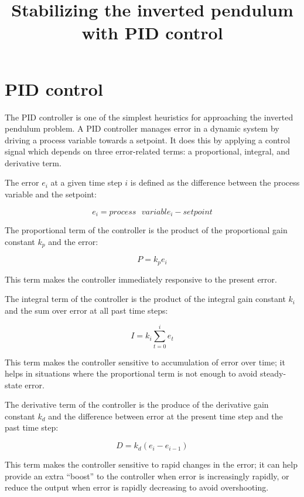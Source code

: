 \documentclass[12pt]{article}
\title{Stabilizing the inverted pendulum with PID control}
\date{}
\begin{document}
\maketitle

\section{PID control}

The PID controller is one of the simplest heuristics for approaching the inverted pendulum problem. A PID controller manages error in a dynamic system by driving a process variable towards a setpoint. It does this by applying a control signal which depends on three error-related terms: a proportional, integral, and derivative term.

The error $e_i$ at a given time step $i$ is defined as the difference between the process variable and the setpoint:

\begin{equation}
e_i = process\mbox{ }variable_i - setpoint
\end{equation}

The proportional term of the controller is the product of the proportional gain constant $k_p$ and the error:

\begin{equation}
P = k_p e_i
\end{equation}

This term makes the controller immediately responsive to the present error.

The integral term of the controller is the product of the integral gain constant $k_i$ and the sum over error at all past time steps:

\begin{equation}
I = k_i \sum_{t = 0}^{i} e_t
\end{equation}

This term makes the controller sensitive to accumulation of error over time; it helps in situations where the proportional term is not enough to avoid steady-state error.

The derivative term of the controller is the produce of the derivative gain constant $k_d$ and the difference between error at the present time step and the past time step:

\begin{equation}
D = k_d (e_i - e_{i-1})
\end{equation}

This term makes the controller sensitive to rapid changes in the error; it can help provide an extra ``boost'' to the controller when error is increasingly rapidly, or reduce the output when error is rapidly decreasing to avoid overshooting.
\end{document}
